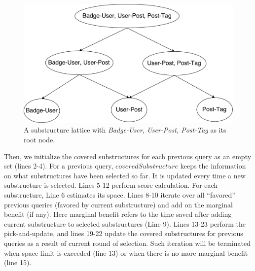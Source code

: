 \begin {figure}[h]
\centering
\includegraphics[scale=0.45]{pic/slattice.pdf}
\caption{A substructure lattice with \textit{Badge-User, User-Post, Post-Tag} as its root node.}
\label{fig:4:3}
\end{figure}


Then, we initialize the covered substructures for each previous query as an empty set (lines 2-4). For a previous query, $coveredSubstructure$ keeps the information on what substructures have been selected so far. %
It is updated every time a new substructure is selected. Lines 5-12 perform score calculation. For each substructure, Line 6 estimates its space. Lines 8-10 iterate over all ``favored'' previous queries (favored by current substructure) and add on the marginal benefit (if any). Here marginal benefit refers to the time saved after adding current substructure to selected substructures (Line 9). Lines 13-23 perform the pick-and-update, and lines 19-22 update the covered substructures for previous queries as a result of current round of selection. Such iteration will be terminated when space limit is exceeded (line 13) or when there is no more marginal benefit (line 15).

